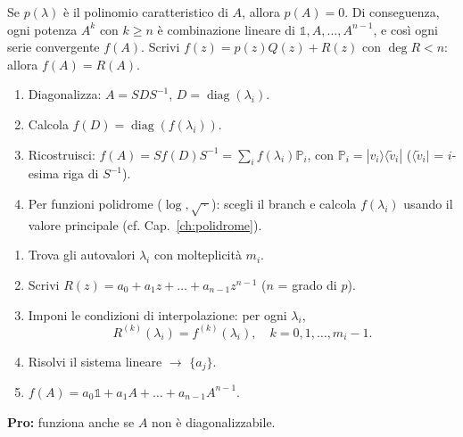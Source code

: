 \documentclass[11pt,a4paper,openany]{book}
\theoremstyle{definition}
\newcommand{\ket}[1]{|#1\rangle}
\newcommand{\bra}[1]{\langle#1|}
\begin{document}
\begin{teoria}
Se $p(\lambda)$ \`e il polinomio caratteristico di $A$, allora $p(A)=0$. Di conseguenza, ogni potenza $A^k$ con $k\ge n$ \`e combinazione lineare di $\mathbb 1, A,\dots,A^{n-1}$, e cos\`i ogni serie convergente $f(A)$. Scrivi $f(z)=p(z)Q(z)+R(z)$ con $\deg R<n$: allora $f(A)=R(A)$.
\end{teoria}

\begin{algoritmo}
\begin{enumerate}
\item Diagonalizza: $A=SDS^{-1}$, $D=\operatorname{diag}(\lambda_i)$.
\item Calcola $f(D)=\operatorname{diag}(f(\lambda_i))$.
\item Ricostruisci: $f(A)=Sf(D)S^{-1}=\sum_i f(\lambda_i)\mathbb P_i$, con $\mathbb P_i=\ket{v_i}\bra{\tilde v_i}$ ($\bra{\tilde v_i}$ = $i$-esima riga di $S^{-1}$).
\item Per funzioni polidrome ($\log,\sqrt{\,\cdot\,}$): scegli il branch e calcola $f(\lambda_i)$ usando il valore principale (cf. Cap.~\ref{ch:polidrome}).
\end{enumerate}
\end{algoritmo}

\begin{algoritmo}
\begin{enumerate}
\item Trova gli autovalori $\lambda_i$ con molteplicit\`a $m_i$.
\item Scrivi $R(z)=a_0+a_1 z+\dots+a_{n-1}z^{n-1}$ ($n$ = grado di $p$).
\item Imponi le condizioni di interpolazione: per ogni $\lambda_i$,
$$R^{(k)}(\lambda_i)=f^{(k)}(\lambda_i),\quad k=0,1,\dots,m_i-1.$$
\item Risolvi il sistema lineare $\to$ $\{a_j\}$.
\item $f(A)=a_0\mathbb 1+a_1 A+\dots+a_{n-1}A^{n-1}$.
\end{enumerate}
\textbf{Pro:} funziona anche se $A$ non \`e diagonalizzabile.
\end{algoritmo}
\end{document}
